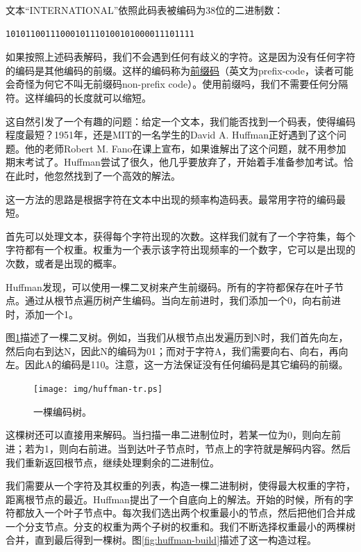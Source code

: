 \documentclass[UTF8]{article}
\begin{document}
文本“INTERNATIONAL”依照此码表被编码为38位的二进制数：

\begin{verbatim}
10101100111000101110100101000011101111
\end{verbatim}

如果按照上述码表解码，我们不会遇到任何有歧义的字符。这是因为没有任何字符的编码是其他编码的前缀。这样的编码称为\underline{前缀码}（英文为prefix-code，读者可能会奇怪为何它不叫无前缀码non-prefix code）。使用前缀吗，我们不需要任何分隔符。这样编码的长度就可以缩短。

这自然引发了一个有趣的问题：给定一个文本，我们能否找到一个码表，使得编码程度最短？1951年，还是MIT的一名学生的David A. Huffman正好遇到了这个问题\cite{Huffman}。他的老师Robert M. Fano在课上宣布，如果谁解出了这个问题，就不用参加期末考试了。Huffman尝试了很久，他几乎要放弃了，开始着手准备参加考试。恰在此时，他忽然找到了一个高效的解法。

这一方法的思路是根据字符在文本中出现的频率构造码表。最常用字符的编码最短。

首先可以处理文本，获得每个字符出现的次数。这样我们就有了一个字符集，每个字符都有一个权重。权重为一个表示该字符出现频率的一个数字，它可以是出现的次数，或者是出现的概率。

Huffman发现，可以使用一棵二叉树来产生前缀码。所有的字符都保存在叶子节点。通过从根节点遍历树产生编码。当向左前进时，我们添加一个0，向右前进时，添加一个1。

图\ref{fig:huffman-tr}描述了一棵二叉树。例如，当我们从根节点出发遍历到N时，我们首先向左，然后向右到达N，因此N的编码为01；而对于字符A，我们需要向右、向右，再向左。因此A的编码是110。注意，这一方法保证没有任何编码是其它编码的前缀。

\begin{figure}[htbp]
 \centering
 \texttt{[image: img/huffman-tr.ps]}
 \caption{一棵编码树。}
 \label{fig:huffman-tr}
\end{figure}

这棵树还可以直接用来解码。当扫描一串二进制位时，若某一位为0，则向左前进；若为1，则向右前进。当到达叶子节点时，节点上的字符就是解码内容。然后我们重新返回根节点，继续处理剩余的二进制位。

我们需要从一个字符及其权重的列表，构造一棵二进制树，使得最大权重的字符，距离根节点的最近。Huffman提出了一个自底向上的解法。开始的时候，所有的字符都放入一个叶子节点中。每次我们选出两个权重最小的节点，然后把他们合并成一个分支节点。分支的权重为两个子树的权重和。我们不断选择权重最小的两棵树合并，直到最后得到一棵树。图\ref{fig:huffman-build}描述了这一构造过程。
\end{document}
